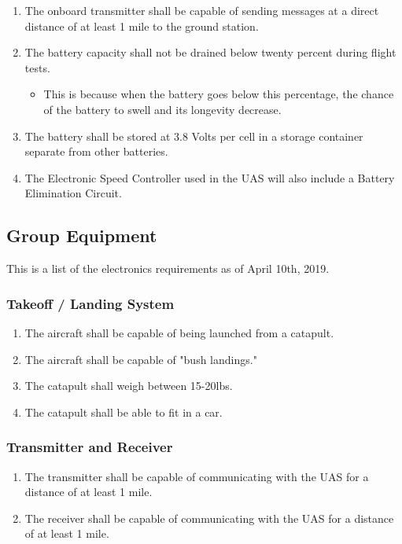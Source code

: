 \documentclass{article}
\begin{document}
\begin{enumerate}
  \item{The onboard transmitter shall be capable of sending messages at a direct distance of at least 1 mile to the ground station.}
  \item{The battery capacity shall not be drained below twenty percent during flight tests.}
  \begin{itemize}
    \item{This is because when the battery goes below this percentage, the chance of the battery to swell and its longevity decrease.}
  \end{itemize}
  \item{The battery shall be stored at 3.8 Volts per cell in a storage container separate from other batteries.}
  \item{The Electronic Speed Controller used in the UAS will also include a Battery Elimination Circuit.}

\end{enumerate}

\subsection{Group Equipment}
This is a list of the electronics requirements as of April 10th, 2019.

\subsubsection{Takeoff / Landing System}
\begin{enumerate}
  \item{The aircraft shall be capable of being launched from a catapult.}
  \item{The aircraft shall be capable of "bush landings."}
  \item{The catapult shall weigh between 15-20lbs.}
  \item{The catapult shall be able to fit in a car.}

\end{enumerate}

\subsubsection{Transmitter and Receiver}
\begin{enumerate}
  \item{The transmitter shall be capable of communicating with the UAS for a distance of at least 1 mile.}
  \item{The receiver shall be capable of communicating with the UAS for a distance of at least 1 mile.}

\end{enumerate}
\end{document}
